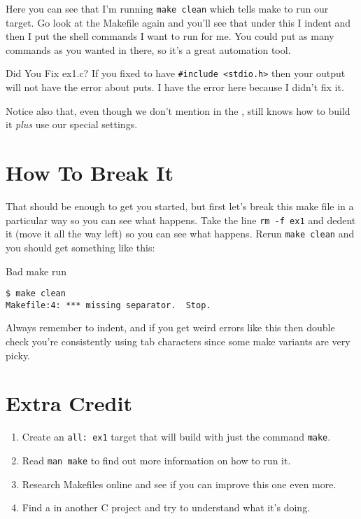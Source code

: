Here you can see that I'm running \verb|make clean| which tells
make to run our  target.  Go look at the Makefile
again and you'll see that under this I indent and then I put
the shell commands I want  to run for me.  You could
put as many commands as you wanted in there, so it's a great
automation tool.

\begin{aside}{Did You Fix ex1.c?}
If you fixed  to have \verb|#include <stdio.h>| then your
output will not have the error about puts.  I have the error
here because I didn't fix it.
\end{aside}

Notice also that, even though we don't mention  in the
,  still knows how to build it \emph{plus}
use our special settings.


\section{How To Break It}

That should be enough to get you started, but first let's break this 
make file in a particular way so you can see what happens.  Take
the line \verb|rm -f ex1| and dedent it (move it all the way left)
so you can see what happens.  Rerun \verb|make clean| and you should
get something like this:

\begin{Terminal}{Bad make run}
\begin{lstlisting}
$ make clean
Makefile:4: *** missing separator.  Stop.
\end{lstlisting}
\end{Terminal}

Always remember to indent, and if you get weird errors like this
then double check you're consistently using tab characters since
some make variants are very picky.

\section{Extra Credit}

\begin{enumerate}
\item Create an \verb|all: ex1| target that will build  with
    just the command \verb|make|.
\item Read \verb|man make| to find out more information on how to run it.
\item Research Makefiles online and see if you can improve this one even more.
\item Find a  in another C project and try to understand
    what it's doing.
\end{enumerate}

